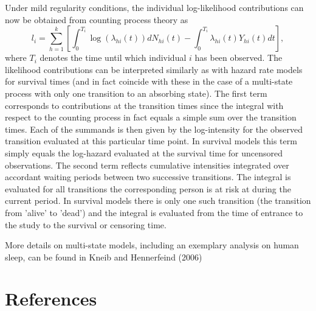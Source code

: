 \documentclass[11pt,a4paper,twoside]{bayesxarticle}
\begin{document}
Under mild regularity conditions, the individual log-likelihood
contributions can now be obtained from counting process theory as
\begin{equation}\label{loglike1}
 l_i = \sum_{h=1}^k\left[ \int_0^{T_i}\log(\lambda_{hi}(t))dN_{hi}(t) -
 \int_0^{T_i}\lambda_{hi}(t)Y_{hi}(t)dt\right],
\end{equation}
where $T_i$ denotes the time until which individual $i$ has been
observed. The likelihood contributions can be interpreted similarly
as with hazard rate models for survival times (and in fact coincide
with these in the case of a multi-state process with only one
transition to an absorbing state). The first term corresponds to
contributions at the transition times since the integral with
respect to the counting process in fact equals a simple sum over the
transition times. Each of the summands is then given by the
log-intensity for the observed transition evaluated at this
particular time point. In survival models this term simply equals
the log-hazard evaluated at the survival time for uncensored
observations. The second term reflects cumulative intensities
integrated over accordant waiting periods between two successive
transitions. The integral is evaluated for all transitions the
corresponding person is at risk at during the current period. In
survival models there is only one such transition (the transition
from 'alive' to 'dead') and the integral is evaluated from the time
of entrance to the study to the survival or censoring time.

More details on multi-state models, including an exemplary analysis
on human sleep, can be found in Kneib and Hennerfeind (2006)

\section{References}
\label{bayesregref}
\end{document}
